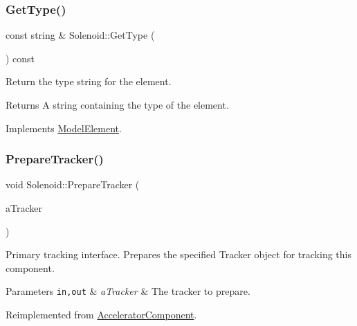 \mbox{\label{classSolenoid_ac120a84dc2b8e02ad747d818b3bf66af}} 
\subsubsection{\texorpdfstring{Get\+Type()}{GetType()}}
{\footnotesize\ttfamily const string \& Solenoid\+::\+Get\+Type (\begin{DoxyParamCaption}{ }\end{DoxyParamCaption}) const\hspace{0.3cm}{\ttfamily [virtual]}}

Return the type string for the element. \begin{DoxyReturn}{Returns}
A string containing the type of the element. 
\end{DoxyReturn}


Implements \hyperlink{classModelElement_a04dc2e51e1999fca612eb1838ec6b271}{Model\+Element}.

\mbox{\label{classSolenoid_a565c5334191f0c4b45b053144db29609}} 
\subsubsection{\texorpdfstring{Prepare\+Tracker()}{PrepareTracker()}}
{\footnotesize\ttfamily void Solenoid\+::\+Prepare\+Tracker (\begin{DoxyParamCaption}\item[{\hyperlink{classComponentTracker}{Component\+Tracker} \&}]{a\+Tracker }\end{DoxyParamCaption})\hspace{0.3cm}{\ttfamily [virtual]}}

Primary tracking interface. Prepares the specified Tracker object for tracking this component. 
\begin{DoxyParams}[1]{Parameters}
\mbox{\tt in,out}  & {\em a\+Tracker} & The tracker to prepare. \\
\hline
\end{DoxyParams}


Reimplemented from \hyperlink{classAcceleratorComponent_ab897c54689ac946f40c3ad0716ddd4bb}{Accelerator\+Component}.

\mbox{\label{classSolenoid_aff80a21647e92b9810f2058d9e8540b2}} 
